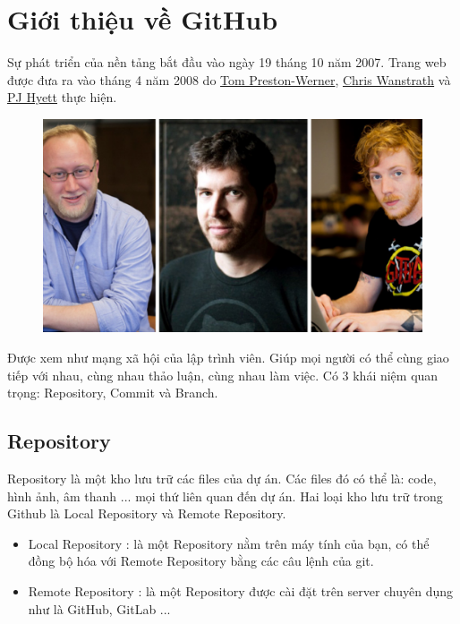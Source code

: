 \documentclass[a4paper]{report}
\begin{document}
\section{Giới thiệu về GitHub}
\textrm{Sự phát triển của nền tảng bắt đầu vào ngày 19 tháng 10 năm 2007. Trang web được đưa ra vào tháng 4 năm 2008 do \href{https://en.wikipedia.org/wiki/Tom_Preston-Werner}{Tom Preston-Werner}, \href{https://en.wikipedia.org/wiki/Chris_Wanstrath}{Chris Wanstrath} và \href{https://en.wikipedia.org/wiki/P._J._Hyett}{PJ Hyett} thực hiện.}
\begin{figure}[ht]
    \centering
    \includegraphics[scale=0.15]{Github_Dev.jpg}
    \caption{}
\end{figure}
\newline
\textrm{Được xem như mạng xã hội của lập trình viên. Giúp mọi người có thể cùng giao tiếp với nhau, cùng nhau thảo luận, cùng nhau làm việc.}
\newline
\textrm{Có 3 khái niệm quan trọng: Repository, Commit và Branch.}

\subsection{Repository}
\textrm{Repository là một kho lưu trữ các files của dự án. Các files đó có thể là: code, hình ảnh, âm thanh ... mọi thứ liên quan đến dự án.}
\newline
\textrm{Hai loại kho lưu trữ trong Github là Local Repository và Remote Repository.}
\begin{itemize}
    \item Local Repository : là một Repository nằm trên máy tính của bạn, có thể đồng bộ hóa với Remote Repository bằng các câu lệnh của git.
    \item Remote Repository : là một Repository được cài đặt trên server chuyên dụng như là GitHub, GitLab ... 
\end{itemize}
\end{document}
